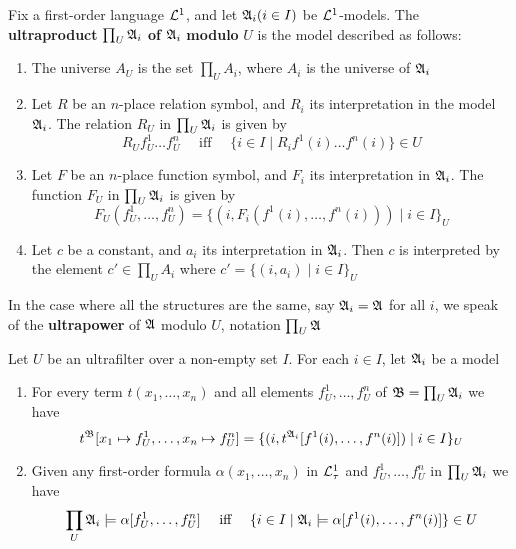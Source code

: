 \documentclass[11pt]{article}
\begin{document}
\begin{definition}[]
Fix a first-order language \(\mathcal{L}^1\), and let \(\mathfrak{A}_i(i\in I)\) be
\(\mathcal{L}^1\)-models. The \textbf{ultraproduct} \(\prod_U\mathfrak{A}_i\) \textbf{of} \(\mathfrak{A}_i\) \textbf{modulo}
\(U\) is the model described as follows:
\begin{enumerate}
\item The universe \(A_U\) is the set \(\prod_UA_i\), where \(A_i\) is the
universe of \(\mathfrak{A}_i\)
\item Let \(R\) be an \(n\)-place relation symbol, and \(R_i\) its
interpretation in the model \(\mathfrak{A}_i\). The relation \(R_U\) in
\(\prod_U\mathfrak{A}_i\) is given by
\begin{equation*}
R_Uf_U^1\dots f_U^n \quad\text{ iff }\quad
\{i\in I\mid R_if^1(i)\dots f^n(i)\}\in U
\end{equation*}
\item Let \(F\) be an \(n\)-place function symbol, and \(F_i\) its
interpretation in \(\mathfrak{A}_i\). The function \(F_U\) in \(\prod_U\mathfrak{A}_i\) is
given by
\begin{equation*}
F_U(f_U^1,\dots,f_U^n)=
\{(i,F_i(f^1(i),\dots,f^n(i)))\mid i\in I\}_U
\end{equation*}
\item Let \(c\) be a constant, and \(a_i\) its interpretation in \(\mathfrak{A}_i\).
Then \(c\) is interpreted by the element \(c'\in\prod_UA_i\) where
\(c'=\{(i,a_i)\mid i\in I\}_U\)
\end{enumerate}


In the case where all the structures are the same, say \(\mathfrak{A}_i=\mathfrak{A}\) for all
\(i\), we speak of the \textbf{ultrapower} of \(\mathfrak{A}\)  modulo \(U\), notation \(\prod_U\mathfrak{A}\)
\end{definition}

\begin{theorem}
\label{thmA.19}
Let \(U\) be an ultrafilter over a non-empty set \(I\). For each \(i\in I\),
let \(\mathfrak{A}_i\) be a model
\begin{enumerate}
\item For every term \(t(x_1,\dots,x_n)\) and all elements
\(f_U^1,\dots,f_U^n\) of \(\mathfrak{B}=\prod_U\mathfrak{A}_i\) we have
\begin{equation*}
t^{\mathfrak{B}}[x_1\mapsto f_U^1,\dots,x_n\mapsto f_U^n]=
\{(i,t^{\mathfrak{A}_i}[f^1(i),\dots,f^n(i)])\mid i\in I\}_U
\end{equation*}
\item Given any first-order formula \(\alpha(x_1,\dots,x_n)\) in \(\mathcal{L}_\tau^1\)
and \(f_U^1,\dots,f_U^n\) in \(\prod_U\mathfrak{A}_i\) we have
\begin{equation*}
\prod_U\mathfrak{A}_i\models\alpha[f_U^1,\dots,f_U^n]
\quad\text{ iff }\quad
\{i\in I\mid\mathfrak{A}_i\models\alpha[f^1(i),\dots,f^n(i)]\}\in U
\end{equation*}
\end{enumerate}
\end{theorem}
\end{document}
